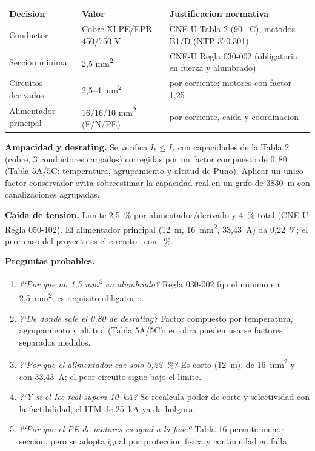 \documentclass[12pt,letterpaper]{report}
\newcommand{\suheader}{\rowcolor{azulunap!14}}
\begin{document}
\begin{table}[H]
\centering
\small
\renewcommand{\arraystretch}{1.12}
\begin{tabularx}{\textwidth}{P{0.30\textwidth} P{0.24\textwidth} L}
\toprule
\suheader \textbf{Decision} & \textbf{Valor} & \textbf{Justificacion normativa} \\
\midrule
Conductor & Cobre XLPE/EPR 450/750 V & CNE-U Tabla 2 (90~\({}^\circ\)C), metodos B1/D (NTP 370.301) \\
Seccion minima & 2,5 mm\textsuperscript{2} & CNE-U Regla 030-002 (obligatoria en fuerza y alumbrado) \\
Circuitos derivados & 2,5--4 mm\textsuperscript{2} & por corriente; motores con factor 1,25 \\
Alimentador principal & 16/16/10 mm\textsuperscript{2} (F/N/PE) & por corriente, caida y coordinacion \\
\bottomrule
\end{tabularx}
\end{table}

\textbf{Ampacidad y desrating.} Se verifica \(I_b \leq I_z\) con capacidades de
la Tabla 2 (cobre, 3 conductores cargados) corregidas por un factor compuesto
de \(0,80\) (Tabla 5A/5C: temperatura, agrupamiento y altitud de Puno). Aplicar
un unico factor conservador evita sobreestimar la capacidad real en un grifo de
3830~m con canalizaciones agrupadas.

\textbf{Caida de tension.} Limite 2,5~\% por alimentador/derivado y 4~\% total
(CNE-U Regla 050-102). El alimentador principal (12~m, 16~mm\textsuperscript{2},
33,43~A) da 0,22~\%; el peor caso del proyecto es el circuito \dVMaxCircuit~con
\dVMaxTotal~\%.

\textbf{Preguntas probables.}
\begin{enumerate}
\item \emph{?`Por que no 1,5 mm\textsuperscript{2} en alumbrado?} Regla 030-002
  fija el minimo en 2,5~mm\textsuperscript{2}; es requisito obligatorio.
\item \emph{?`De donde sale el 0,80 de desrating?} Factor compuesto por
  temperatura, agrupamiento y altitud (Tabla 5A/5C); en obra pueden usarse
  factores separados medidos.
\item \emph{?`Por que el alimentador cae solo 0,22~\%?} Es corto (12~m), de
  16~mm\textsuperscript{2} y con 33,43~A; el peor circuito sigue bajo el limite.
\item \emph{?`Y si el Icc real supera 10~kA?} Se recalcula poder de corte y
  selectividad con la factibilidad; el ITM de 25~kA ya da holgura.
\item \emph{?`Por que el PE de motores es igual a la fase?} Tabla 16 permite
  menor seccion, pero se adopta igual por proteccion fisica y continuidad en
  falla.
\end{enumerate}
\end{document}
